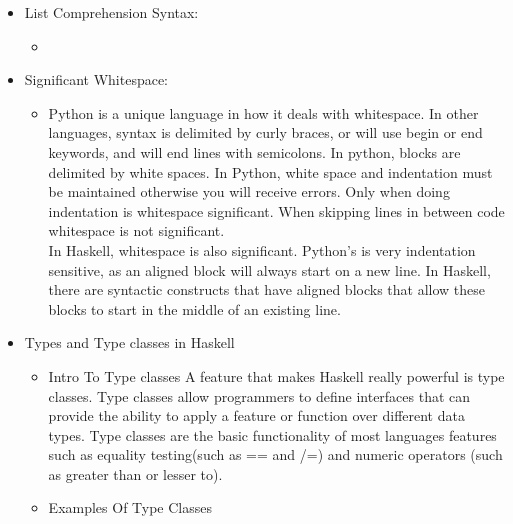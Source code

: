 \documentclass{article}
\begin{document}
\begin{itemize}
  \item List Comprehension Syntax:
  \begin{itemize}
    \item
    \end{itemize}
  \item Significant Whitespace:
    \begin{itemize}
    \item Python is a unique language in how it deals with whitespace. In other languages, syntax is delimited by curly braces, or will use begin or end keywords, and will end lines with semicolons. In python, blocks are delimited by white spaces. In Python, white space and indentation must be maintained otherwise you will receive errors. Only when doing indentation is whitespace significant. When skipping lines in between code whitespace is not significant.
    \\
    In Haskell, whitespace is also significant. Python's is very indentation sensitive, as an aligned block will always start on a new line. In Haskell, there are syntactic constructs that have aligned blocks that allow these blocks to start in the middle of an existing line.
    \end{itemize}
  \item Types and Type classes in Haskell
  \begin{itemize}
      \item Intro To Type classes
      A feature that makes Haskell really powerful is type classes. Type classes allow programmers to define interfaces that can provide the ability to apply a feature or function over different data types. Type classes are the basic functionality of most languages features such as equality testing(such as == and /=) and numeric operators (such as greater than or lesser to).
      \\
      \item Examples Of Type Classes


\end{itemize}
\end{itemize}
\end{document}
